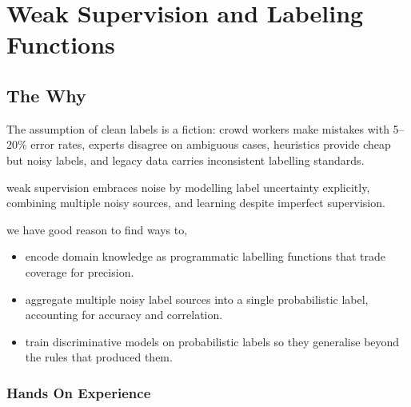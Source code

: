 
\chapter{Weak Supervision and Labeling Functions}


\section{The Why}


The assumption of clean labels is a fiction: crowd workers make mistakes with 5--20\% error rates, experts disagree on ambiguous cases, heuristics provide cheap but noisy labels, and legacy data carries inconsistent labelling standards.

 weak supervision embraces noise by modelling label uncertainty explicitly, combining multiple noisy sources, and learning despite imperfect supervision.

 we have good reason to find ways to,
\begin{itemize}
    \item encode domain knowledge as programmatic labelling functions that trade coverage for precision.
    \item aggregate multiple noisy label sources into a single probabilistic label, accounting for accuracy and correlation.
    \item train discriminative models on probabilistic labels so they generalise beyond the rules that produced them.
\end{itemize}

\subsection{Hands On Experience}

